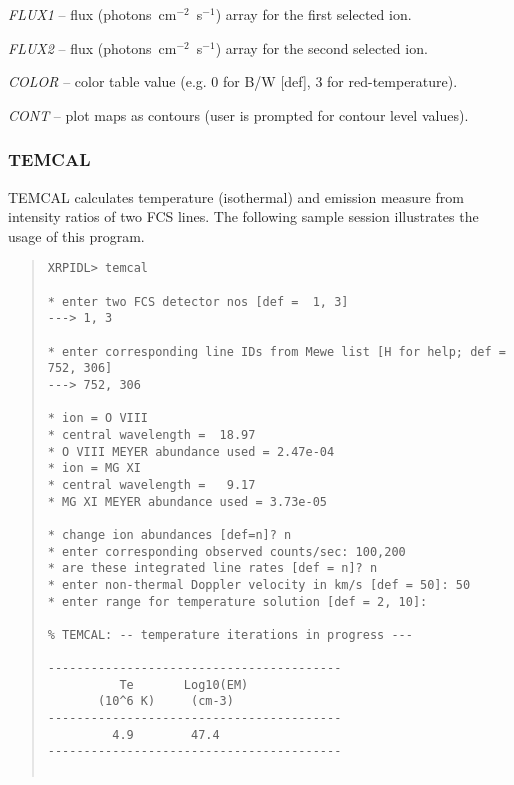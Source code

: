 {{{{\it FLUX1} -- flux (photons~cm$^{-2}$~s$^{-1}$) array for the first selected
ion.

{\it FLUX2} -- flux (photons~cm$^{-2}$~s$^{-1}$) array for the second selected
ion.


{\it COLOR} -- color table value (e.g. 0 for B/W [def], 3 for red-temperature).

{\it CONT} -- plot maps as contours (user is prompted for contour level values).

\subsubsection{TEMCAL}

TEMCAL calculates temperature (isothermal) and emission measure from
intensity ratios of two FCS lines. The following sample session
illustrates the usage of this program.
\begin{quote}
\begin{verbatim}
XRPIDL> temcal

* enter two FCS detector nos [def =  1, 3]
---> 1, 3

* enter corresponding line IDs from Mewe list [H for help; def = 752, 306]
---> 752, 306

* ion = O VIII
* central wavelength =  18.97
* O VIII MEYER abundance used = 2.47e-04
* ion = MG XI
* central wavelength =   9.17
* MG XI MEYER abundance used = 3.73e-05

* change ion abundances [def=n]? n
* enter corresponding observed counts/sec: 100,200
* are these integrated line rates [def = n]? n
* enter non-thermal Doppler velocity in km/s [def = 50]: 50
* enter range for temperature solution [def = 2, 10]:

% TEMCAL: -- temperature iterations in progress ---

-----------------------------------------
          Te       Log10(EM)
       (10^6 K)     (cm-3)
-----------------------------------------
         4.9        47.4
-----------------------------------------


\end{verbatim}
\end{quote}}}}
